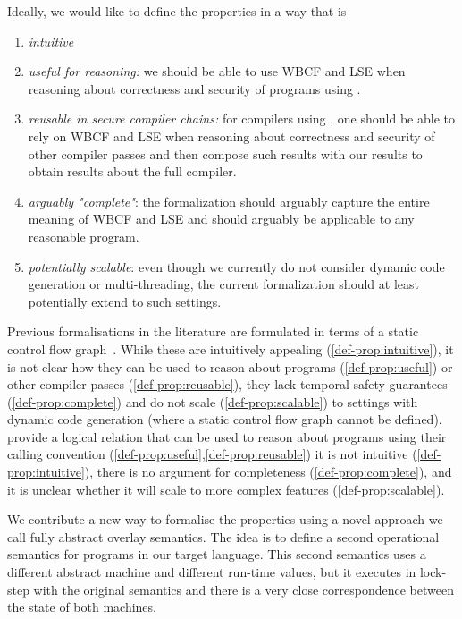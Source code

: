 \documentclass[acmsmall,review,showframe]{acmart}\settopmatter{printfolios=true,printccs=false,printacmref=false}
\begin{document}
Ideally, we would like to define the properties in a way that is
\begin{enumerate}
\item {\itshape intuitive} \label{def-prop:intuitive}
\item {\itshape useful for reasoning:} we should be able to use WBCF and LSE when reasoning about correctness and security of programs using \stktokens{}. \label{def-prop:useful}
\item {\itshape reusable in secure compiler chains:} for compilers using \stktokens{}, one should be able to rely on WBCF and LSE when reasoning about correctness and security of other compiler passes and then compose such results with our results to obtain results about the full compiler. \label{def-prop:reusable}
\item {\itshape arguably "complete"}: the formalization should arguably capture the entire meaning of WBCF and LSE and should arguably be applicable to any reasonable program. \label{def-prop:complete}
\item {\itshape potentially scalable}: even though we currently do not consider dynamic code generation or multi-threading, the current formalization should at least potentially extend to such settings. \label{def-prop:scalable}
\end{enumerate}

Previous formalisations in the literature are formulated in terms of a static control flow graph~\cite[e.g., ]{Abadi2005Theory}.
While these are intuitively appealing (\ref{def-prop:intuitive}), it is not clear how they can be used to reason about programs (\ref{def-prop:useful}) or other compiler passes (\ref{def-prop:reusable}), they lack temporal safety guarantees (\ref{def-prop:complete}) and do not scale (\ref{def-prop:scalable}) to settings with dynamic code generation (where a static control flow graph cannot be defined).
\citet{skorstengaard_reasoning_2017} provide a logical relation that can be used to reason about programs using their calling convention (\ref{def-prop:useful},\ref{def-prop:reusable}) it is not intuitive (\ref{def-prop:intuitive}), there is no argument for completeness (\ref{def-prop:complete}), and it is unclear whether it will scale to more complex features (\ref{def-prop:scalable}).

We contribute a new way to formalise the properties using a novel approach we call fully abstract overlay semantics.
The idea is to define a second operational semantics for programs in our target language.
This second semantics uses a different abstract machine and different run-time values, but it executes in lock-step with the original semantics and there is a very close correspondence between the state of both machines.
\end{document}
